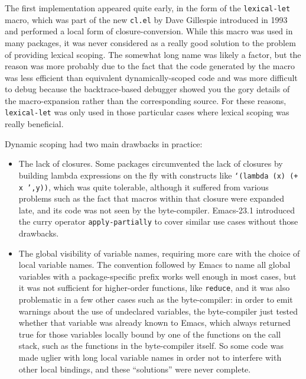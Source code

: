 \documentclass[format=acmsmall, review=false, screen=true]{acmart}
\begin{document}
The first implementation appeared quite early, in the form of the
\texttt{lexical-let} macro, which was part of the new \texttt{cl.el} by Dave
Gillespie  introduced in 1993 and performed
a local form of closure-conversion.
While this macro was used in many packages, it was never considered as
a really good solution to the problem of providing lexical scoping.
The somewhat long name was likely a factor, but the reason was more probably
due to the fact that the code generated by the macro was less efficient than
equivalent dynamically-scoped code and was more difficult to debug because
the backtrace-based debugger showed you the gory details of the
macro-expansion rather than the corresponding source.  For these reasons,
\texttt{lexical-let} was only used in those particular cases where lexical
scoping was really beneficial.

Dynamic scoping had two main drawbacks in practice:
\begin{itemize}
\item The lack of closures.  Some packages circumvented the lack of closures
  by building lambda expressions on the fly with constructs like
  \texttt{`(lambda (x) (+ x ',y))}, which was quite tolerable, %
  although it
  suffered from various problems such as the fact that macros within that
  closure were expanded late, and its code was not seen by the
  byte-compiler.  Emacs-23.1 introduced the curry operator
  \texttt{apply-partially} to cover similar use cases without
  those drawbacks.
\item The global visibility of variable names, requiring more care with the
  choice of local variable names.  The convention followed by Emacs to name
  all global variables with a package-specific prefix works well enough in
  most cases, but it was not sufficient for higher-order functions, like
  \texttt{reduce}, and it was also problematic in a few other cases such as
  the byte-compiler: in order to emit warnings about the use of undeclared
  variables, the byte-compiler just tested whether that variable was already
  known to Emacs, which always returned true for those variables locally
  bound by one of the functions on the call stack, such as the functions in
  the byte-compiler itself.  So some code was made uglier with long local
  variable names in order not to interfere with other local bindings, and
  these ``solutions'' were never complete.
\end{itemize}
\end{document}
